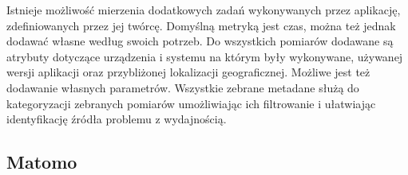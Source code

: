 Istnieje możliwość mierzenia dodatkowych zadań wykonywanych przez aplikację, zdefiniowanych przez jej twórcę. Domyślną metryką jest czas, można też jednak dodawać własne według swoich potrzeb. Do wszystkich pomiarów dodawane są atrybuty dotyczące urządzenia i systemu na którym były wykonywane, używanej wersji aplikacji oraz przybliżonej lokalizacji geograficznej. Możliwe jest też dodawanie własnych parametrów. Wszystkie zebrane metadane służą do kategoryzacji zebranych pomiarów umożliwiając ich  filtrowanie i ułatwiając identyfikację źródła problemu z wydajnością.

\subsection{Matomo}
